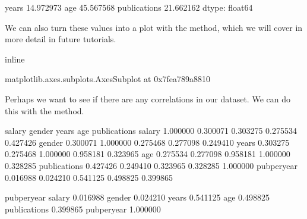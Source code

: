 \documentclass[letterpaper,10pt,english]{sphinxmanual}
\begin{document}
\begin{sphinxVerbatim}[commandchars=\\\{\}]
years           14.972973
age             45.567568
publications    21.662162
dtype: float64
\end{sphinxVerbatim}

We can also turn these values into a plot with the  method, which we will cover in more detail in future tutorials.

\begin{sphinxVerbatim}[commandchars=\\\{\}]
 inline

\PYG{p}{[}\PYG{p}{[}  \PYG{p}{]}\PYG{p}{]}
\end{sphinxVerbatim}

\begin{sphinxVerbatim}[commandchars=\\\{\}]
\PYGZlt{}matplotlib.axes.\PYGZus{}subplots.AxesSubplot at 0x7fea789a8810\PYGZgt{}
\end{sphinxVerbatim}

\noindent{}

Perhaps we want to see if there are any correlations in our dataset. We can do this with the  method.

\begin{sphinxVerbatim}[commandchars=\\\{\}]
\end{sphinxVerbatim}

\begin{sphinxVerbatim}[commandchars=\\\{\}]
                salary    gender     years       age  publications  \PYGZbs{}
salary        1.000000 \PYGZhy{}0.300071  0.303275  0.275534      0.427426   
gender       \PYGZhy{}0.300071  1.000000 \PYGZhy{}0.275468 \PYGZhy{}0.277098     \PYGZhy{}0.249410   
years         0.303275 \PYGZhy{}0.275468  1.000000  0.958181      0.323965   
age           0.275534 \PYGZhy{}0.277098  0.958181  1.000000      0.328285   
publications  0.427426 \PYGZhy{}0.249410  0.323965  0.328285      1.000000   
pub\PYGZus{}per\PYGZus{}year \PYGZhy{}0.016988  0.024210 \PYGZhy{}0.541125 \PYGZhy{}0.498825      0.399865   

              pub\PYGZus{}per\PYGZus{}year  
salary           \PYGZhy{}0.016988  
gender            0.024210  
years            \PYGZhy{}0.541125  
age              \PYGZhy{}0.498825  
publications      0.399865  
pub\PYGZus{}per\PYGZus{}year      1.000000  
\end{sphinxVerbatim}
\end{document}
